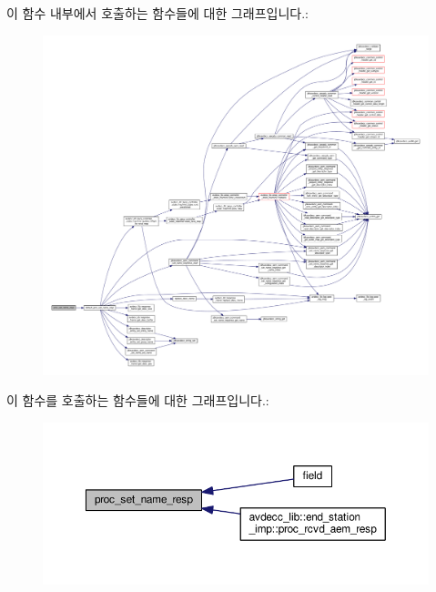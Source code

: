 이 함수 내부에서 호출하는 함수들에 대한 그래프입니다.\+:
\nopagebreak
\begin{figure}[H]
\begin{center}
\leavevmode
\includegraphics[width=350pt]{classavdecc__lib_1_1descriptor__base__imp_a182c43d9f31980bb74f05956b1323624_cgraph}
\end{center}
\end{figure}




이 함수를 호출하는 함수들에 대한 그래프입니다.\+:
\nopagebreak
\begin{figure}[H]
\begin{center}
\leavevmode
\includegraphics[width=350pt]{classavdecc__lib_1_1descriptor__base__imp_a182c43d9f31980bb74f05956b1323624_icgraph}
\end{center}
\end{figure}


